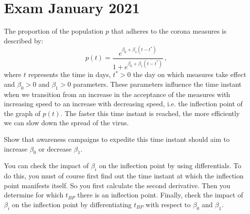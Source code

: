\section{Exam January 2021}

\begin{Exercise} %
The proportion of the population $p$ that adheres to the corona measures is described by:
$$
p(t)=\dfrac{e^{\beta_0+\beta_1(t-t^*)}}{1+e^{\beta_0+\beta_1(t-t^*)}}\,,
$$
where $t$ represents the time in days, $t^*>0$ the day on which measures take effect and $\beta_0>0$ and $\beta_1>0$ parameters. These parameters influence the time instant when we transition from an increase in the acceptance of the measures with increasing speed to an increase with decreasing speed, i.e. the inflection point of the graph of $p(t)$. The faster this time instant is reached, the more efficiently we can slow down the spread of the virus.  

Show that awareness campaigns to expedite this time instant should aim to increase $\beta_0$ or decrease $\beta_1$.
\end{Exercise} 

\begin{Answer}\phantom{}
You can check the impact of $\beta_i$ on the inflection point by using differentials. To do this, you must of course first find out the time instant at which the inflection point manifests itself. So you first calculate the second derivative. Then you determine for which $t_{BP}$ there is an inflection point. Finally, check the impact of $\beta_i$ on the inflection point by differentiating $t_{BP}$ with respect to $\beta_0$ and $\beta_1$.
\end{Answer}


